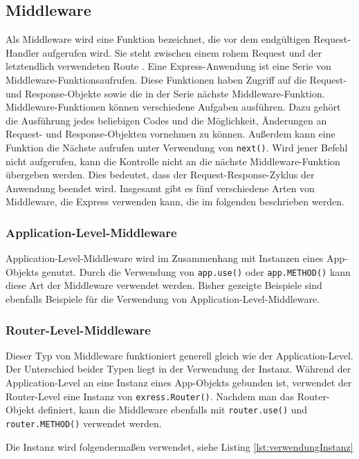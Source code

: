 \subsection{Middleware}

Als Middleware wird eine Funktion bezeichnet, die vor dem endgültigen Request-Handler aufgerufen wird. Sie steht zwischen einem rohem Request und der letztendlich verwendeten Route \cite{nsieben}.
Eine Express-Anwendung ist eine Serie von Middleware-Funktionsaufrufen. Diese Funktionen haben Zugriff auf die Request- und Response-Objekte sowie die in der Serie nächste Middleware-Funktion. 
Middleware-Funktionen können verschiedene Aufgaben ausführen. Dazu gehört die Ausführung jedes beliebigen Codes und die Möglichkeit, Änderungen an Request- und Response-Objekten vornehmen zu können. Außerdem kann eine Funktion die Nächste aufrufen unter Verwendung von \texttt{next()}. Wird jener Befehl nicht aufgerufen, kann die Kontrolle nicht an die nächste Middleware-Funktion übergeben werden. Dies bedeutet, dass der Request-Response-Zyklus der Anwendung beendet wird.
Insgesamt gibt es fünf verschiedene Arten von Middleware, die Express verwenden kann, die im folgenden beschrieben werden. 

\subsubsection{Application-Level-Middleware}

Application-Level-Middleware wird im Zusammenhang mit Instanzen eines App-Objekts genutzt. Durch die Verwendung von \texttt{app.use()} oder \texttt{app.METHOD()} kann diese Art der Middleware verwendet werden. Bisher gezeigte Beispiele sind ebenfalls Beispiele für die Verwendung von Application-Level-Middleware.

\subsubsection{Router-Level-Middleware}

Dieser Typ von Middleware funktioniert generell gleich wie der Application-Level. Der Unterschied beider Typen liegt in der Verwendung der Instanz. Während der Application-Level an eine Instanz eines App-Objekts gebunden ist, verwendet der Router-Level eine Instanz von \texttt{exress.Router()}. Nachdem man das Router-Objekt definiert, kann die Middleware ebenfalls mit \texttt{router.use()} und \texttt{router.METHOD()} verwendet werden. 

Die Instanz wird folgendermaßen verwendet, siehe Listing \ref*{lst:verwendungInstanz}

